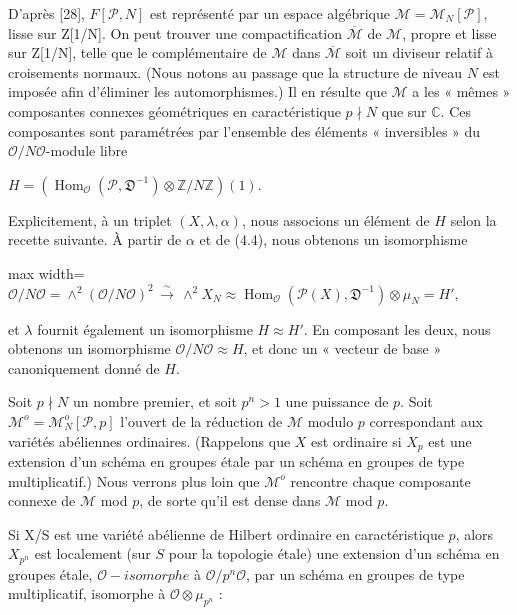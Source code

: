 \documentclass[11pt]{article}
\newcommand{\DFormula}[1]{\par\smallskip\noindent\begin{adjustbox}{max width=\linewidth}$\displaystyle #1$\end{adjustbox}\par\smallskip}
\begin{document}
\par
D’après [28], \(F[\mathcal{P},N]\) est représenté par un espace algébrique \(\mathcal{M}=\mathcal{M}_{N}[\mathcal{P}]\), lisse sur Z[1/N]. On peut trouver une compactification \(\overline{\mathcal{M}}\) de \(\mathcal{M}\), propre et lisse sur Z[1/N], telle que le complémentaire de \(\mathcal{M}\) dans \(\overline{\mathcal{M}}\) soit un diviseur relatif à croisements normaux. (Nous notons au passage que la structure de niveau \(N\) est imposée afin d’éliminer les automorphismes.) Il en résulte que \(\mathcal{M}\) a les « mêmes » composantes connexes géométriques en caractéristique \(p\nmid N\) que sur \(\mathbb{C}\). Ces composantes sont paramétrées par l’ensemble des éléments « inversibles » du \(\mathcal{O}/N\mathcal{O}\)-module libre\par
\par
\(H=(\operatorname{Hom}_{\mathcal{O}}(\mathcal{P},𝔇^{-1})\otimes \mathbb{Z}/N\mathbb{Z})(1)\).\par
\par
Explicitement, à un triplet \((X,\lambda ,\alpha )\), nous associons un élément de \(H\) selon la recette suivante. À partir de \(\alpha \) et de (4.4), nous obtenons un isomorphisme\par
\par
\DFormula{\mathcal{O}/N\mathcal{O}=\wedge ^{2}(\mathcal{O}/N\mathcal{O})^{2}\,\xrightarrow{\sim}\,\wedge ^{2}X_{N}\approx \operatorname{Hom}_{\mathcal{O}}(\mathcal{P}(X),𝔇^{-1})\otimes \mu _{N}=H',}
\par
et \(\lambda \) fournit également un isomorphisme \(H\approx H'\). En composant les deux, nous obtenons un isomorphisme \(\mathcal{O}/N\mathcal{O}\approx H\), et donc un « vecteur de base » canoniquement donné de \(H\).\par
\par
Soit \(p\nmid N\) un nombre premier, et soit \(p^{n}>1\) une puissance de \(p\). Soit \(\mathcal{M}^{o}=\mathcal{M}_{N}^{o}[\mathcal{P},p]\) l’ouvert de la réduction de \(\mathcal{M}\) modulo \(p\) correspondant aux variétés abéliennes ordinaires. (Rappelons que \(X\) est ordinaire si \(X_{p}\) est une extension d’un schéma en groupes étale par un schéma en groupes de type multiplicatif.) Nous verrons plus loin que \(\mathcal{M}^{o}\) rencontre chaque composante connexe de \(\mathcal{M}\) mod \(p\), de sorte qu’il est dense dans \(\mathcal{M}\) mod \(p\).\par
\par
Si X/S est une variété abélienne de Hilbert ordinaire en caractéristique \(p\), alors \(X_{p^{n}}\) est localement (sur \(S\) pour la topologie étale) une extension d’un schéma en groupes étale, \(\mathcal{O}-isomorphe\) à \(\mathcal{O}/p^{n}\mathcal{O}\), par un schéma en groupes de type multiplicatif, isomorphe à \(\mathcal{O}\otimes \mu _{p^{n}}\) :\par
\end{document}

